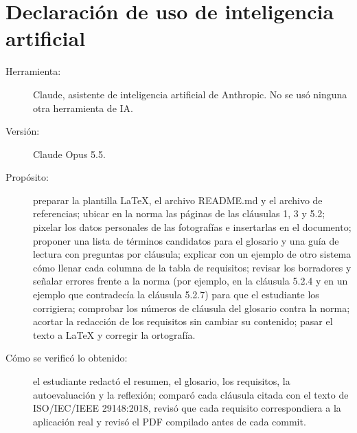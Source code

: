 \documentclass[11pt,a4paper]{article}
\begin{document}
\section{Declaración de uso de inteligencia artificial}
\begin{description}
	\item[Herramienta:] Claude, asistente de inteligencia artificial de Anthropic. No se usó ninguna otra herramienta de IA.
	\item[Versión:] Claude Opus 5.5.
	\item[Propósito:] preparar la plantilla \LaTeX{}, el archivo README.md y el archivo de referencias; ubicar en la norma las páginas de las cláusulas 1, 3 y 5.2; pixelar los datos personales de las fotografías e insertarlas en el documento; proponer una lista de términos candidatos para el glosario y una guía de lectura con preguntas por cláusula; explicar con un ejemplo de otro sistema cómo llenar cada columna de la tabla de requisitos; revisar los borradores y señalar errores frente a la norma (por ejemplo, en la cláusula 5.2.4 y en un ejemplo que contradecía la cláusula 5.2.7) para que el estudiante los corrigiera; comprobar los números de cláusula del glosario contra la norma; acortar la redacción de los requisitos sin cambiar su contenido; pasar el texto a \LaTeX{} y corregir la ortografía.
	\item[Cómo se verificó lo obtenido:] el estudiante redactó el resumen, el glosario, los requisitos, la autoevaluación y la reflexión; comparó cada cláusula citada con el texto de ISO/IEC/IEEE 29148:2018, revisó que cada requisito correspondiera a la aplicación real y revisó el PDF compilado antes de cada commit.
\end{description}



\end{document}
